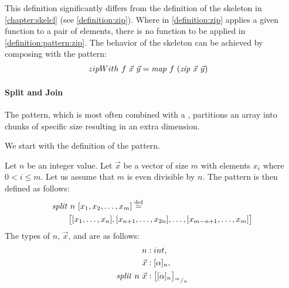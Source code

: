 \noindent
This definition significantly differs from the definition of the \zip skeleton in \autoref{chapter:skelcl} (see \autoref{definition:zip}).
Where in \autoref{definition:zip} \zip applies a given function to a pair of elements, there is no function to be applied in \autoref{definition:pattern:zip}.
The behavior of the \zip skeleton can be achieved by composing \zip with the \map pattern:
\begin{align*}
  zipWith\ f\ \vec{x}\ \vec{y} &= \text{\textit{map}}\ f\ (\text{\textit{zip}}\ \vec{x}\ \vec{y})
\end{align*}


\paragraph{Split and Join}
The \splitN pattern, which is most often combined with a \join, partitions an array into chunks of specific size resulting in an extra dimension.

We start with the definition of the \splitN pattern.
\begin{definition}
  \label{definition:pattern:split}
  Let $n$ be an integer value.
  Let $\vec{x}$ be a vector of size $m$ with elements $x_i$ where $0 < i \leq m$.
  Let us assume that $m$ is even divisible by $n$.
  The \splitN pattern is then defined as follows:
  \begin{align*}
    &\text{\textit{split}}\ n\ [x_1, x_2, \dots, x_m] \stackrel{\textrm{\scriptsize def}}{=}\\
    &\qquad\big[[x_1, \ldots, x_n], [x_{n+1}, \ldots, x_{2n}], \ldots, [x_{m-n+1}, \ldots, x_m]\big]
  \end{align*}
  The types of $n$, $\vec{x}$, and \splitN are as follows:
  \begin{align*}
    n &: int,\\
    \vec{x} &: [\alpha]_n,\\
    \text{\textit{split}}\ n\ \vec{x} &: \big[[\alpha]_n\big]_{{}^m/_n}
  \end{align*}
\end{definition}

\bigskip

